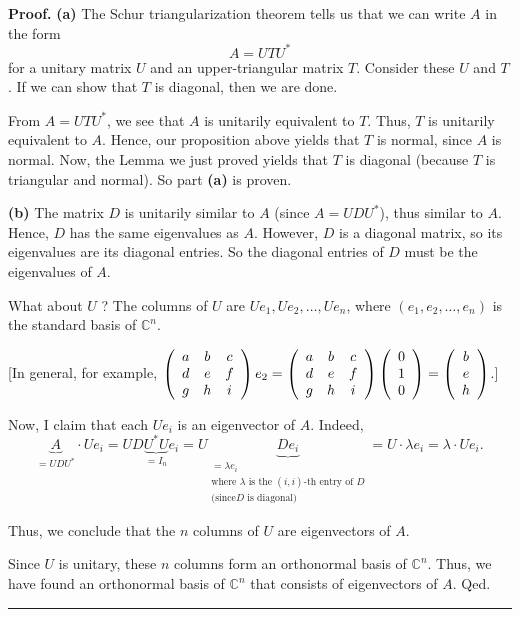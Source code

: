 \documentclass[numbers=enddot,12pt,final,onecolumn,notitlepage]{scrartcl}%
\numberwithin{exer}{subsection}
\theoremstyle{definition}
\newenvironment{proof}[1][Proof]{\noindent\textbf{#1.} }{\ \rule{0.5em}{0.5em}}
\begin{document}
\begin{proof}
\textbf{(a)} The Schur triangularization theorem tells us that we can write
$A$ in the form%
\[
A=UTU^{\ast}%
\]
for a unitary matrix $U$ and an upper-triangular matrix $T$. Consider these
$U$ and $T$. If we can show that $T$ is diagonal, then we are done.

From $A=UTU^{\ast}$, we see that $A$ is unitarily equivalent to $T$. Thus, $T$
is unitarily equivalent to $A$. Hence, our proposition above yields that $T$
is normal, since $A$ is normal. Now, the Lemma we just proved yields that $T$
is diagonal (because $T$ is triangular and normal). So part \textbf{(a)} is proven.

\textbf{(b)} The matrix $D$ is unitarily similar to $A$ (since $A=UDU^{\ast}%
$), thus similar to $A$. Hence, $D$ has the same eigenvalues as $A$. However,
$D$ is a diagonal matrix, so its eigenvalues are its diagonal entries. So the
diagonal entries of $D$ must be the eigenvalues of $A$.

What about $U$ ? The columns of $U$ are $Ue_{1},Ue_{2},\ldots,Ue_{n}$, where
$\left(  e_{1},e_{2},\ldots,e_{n}\right)  $ is the standard basis of
$\mathbb{C}^{n}$.

[In general, for example, $\left(
\begin{array}
[c]{ccc}%
a & b & c\\
d & e & f\\
g & h & i
\end{array}
\right)  e_{2}=\left(
\begin{array}
[c]{ccc}%
a & b & c\\
d & e & f\\
g & h & i
\end{array}
\right)  \left(
\begin{array}
[c]{c}%
0\\
1\\
0
\end{array}
\right)  =\left(
\begin{array}
[c]{c}%
b\\
e\\
h
\end{array}
\right)  $.]

Now, I claim that each $Ue_{i}$ is an eigenvector of $A$. Indeed,
\[
\underbrace{A}_{=UDU^{\ast}}\cdot Ue_{i}=UD\underbrace{U^{\ast}U}_{=I_{n}%
}e_{i}=U\underbrace{De_{i}}_{\substack{=\lambda e_{i}\\\text{where }%
\lambda\text{ is the }\left(  i,i\right)  \text{-th entry of }D\\\text{(since
}D\text{ is diagonal)}}}=U\cdot\lambda e_{i}=\lambda\cdot Ue_{i}.
\]


Thus, we conclude that the $n$ columns of $U$ are eigenvectors of $A$.

Since $U$ is unitary, these $n$ columns form an orthonormal basis of
$\mathbb{C}^{n}$. Thus, we have found an orthonormal basis of $\mathbb{C}^{n}$
that consists of eigenvectors of $A$. Qed.
\end{proof}
\end{document}
